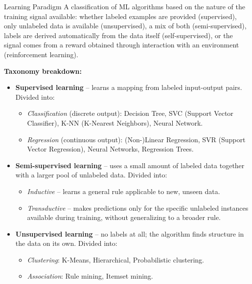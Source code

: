 \begin{defbox}{Learning Paradigm}
A classification of ML algorithms based on the nature of the training signal available: whether labeled examples are provided (supervised), only unlabeled data is available (unsupervised), a mix of both (semi-supervised), labels are derived automatically from the data itself (self-supervised), or the signal comes from a reward obtained through interaction with an environment (reinforcement learning).
\end{defbox}

\pagebreak

\textbf{Taxonomy breakdown:}

\begin{itemize}
    \item \textbf{Supervised learning} -- learns a mapping from labeled input-output pairs. Divided into:
    \begin{itemize}
        \item \emph{Classification} (discrete output): Decision Tree, SVC (Support Vector Classifier), K-NN (K-Nearest Neighbors), Neural Network.
        \item \emph{Regression} (continuous output): (Non-)Linear Regression, SVR (Support Vector Regression), Neural Networks, Regression Trees.
    \end{itemize}
    \vspace{0.2cm}
    \item \textbf{Semi-supervised learning} -- uses a small amount of labeled data together with a larger pool of unlabeled data. Divided into:
    \begin{itemize}
        \item \emph{Inductive} -- learns a general rule applicable to new, unseen data.
        \item \emph{Transductive} -- makes predictions only for the specific unlabeled instances available during training, without generalizing to a broader rule.
    \end{itemize}
    \vspace{0.2cm}
    \item \textbf{Unsupervised learning} -- no labels at all; the algorithm finds structure in the data on its own. Divided into:
    \begin{itemize}
        \item \emph{Clustering}: K-Means, Hierarchical, Probabilistic clustering.
        \item \emph{Association}: Rule mining, Itemset mining.
    \end{itemize}

\end{itemize}
